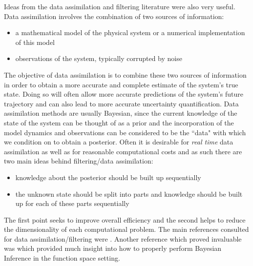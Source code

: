 Ideas from the data assimilation and filtering literature were also very useful. Data assimilation involves the combination of two sources of information:
\begin{itemize}
    \item a mathematical model of the physical system or a numerical implementation of this model
    \item observations of the system, typically corrupted by noise
\end{itemize}
The objective of data assimilation \textcolor{blue}{\cite{sullivan2015introduction}} is to combine these two sources of information in order to obtain a more accurate and complete estimate of the system's true state. Doing so will often allow more accurate predictions of the system's future trajectory and can also lead to more accurate uncertainty quantification. Data assimilation methods are usually Bayesian, since the current knowledge of the state of the system can be thought of as a prior and the incorporation of the model dynamics and observations can be considered to be the ``data" with which we condition on to obtain a posterior. Often it is desirable for \textit{real time} data assimilation as well as for reasonable computational costs and as such there are two main ideas behind filtering/data assimilation:
\begin{itemize}
    \item knowledge about the posterior should be built up sequentially
    \item the unknown state should be split into parts and knowledge should be built up for each of these parts sequentially
\end{itemize}
The first point seeks to improve overall efficiency and the second helps to reduce the dimensionality of each computational problem. The main references consulted for data assimilation/filtering were \textcolor{blue}{\cite{law2015data,sullivan2015introduction,sarkka2013bayesian}}. Another reference which proved invaluable was \textcolor{blue}{\cite{stuart2010inverse}} which provided much insight into how to properly perform Bayesian Inference in the function space setting.
